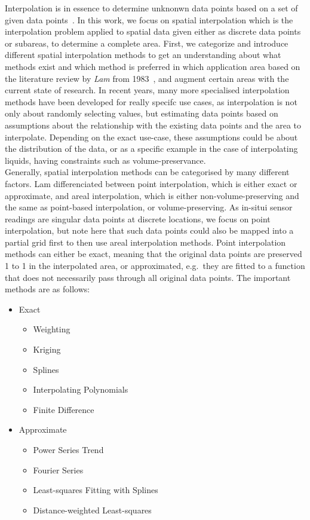 Interpolation is in essence to determine unknonwn data points based on a set of given data points~\cite{steffensen1927interpolation}. In this work, we focus on spatial interpolation which is the interpolation problem applied to spatial data given either as discrete data points or subareas, to determine a complete area. First, we categorize and introduce different spatial interpolation methods to get an understanding about what methods exist and which method is preferred in which application area based on the literature review by \textit{Lam} from 1983~\cite{lam1983spatial}, and augment certain areas with the current state of research. In recent years, many more specialised interpolation methods have been developed for really specifc use cases, as interpolation is not only about randomly selecting values, but estimating data points based on assumptions about the relationship with the existing data points and the area to interpolate. Depending on the exact use-case, these assumptions could be about the distribution of the data, or as a specific example in the case of interpolating liquids, having constraints such as volume-preservance.\\
Generally, spatial interpolation methods can be categorised by many different factors. Lam differenciated between point interpolation, which is either exact or approximate, and areal interpolation, which is either non-volume-preserving and the same as point-based interpolation, or volume-preserving. As in-situi sensor readings are singular data points at discrete locations, we focus on point interpolation, but note here that such data points could also be mapped into a partial grid first to then use areal interpolation methods.
Point interpolation methods can either be exact, meaning that the original data points are preserved 1 to 1 in the interpolated area, or approximated, e.g.\ they are fitted to a function that does not necessarily pass through all original data points. The important methods are as follows:

\begin{itemize}
    \item Exact

    \begin{itemize}
        \item Weighting
        \item Kriging
        \item Splines
        \item Interpolating Polynomials
        \item Finite Difference
    \end{itemize}

    \item Approximate

    \begin{itemize}
        \item Power Series Trend
        \item Fourier Series
        \item Least-squares Fitting with Splines
        \item Distance-weighted Least-squares
    \end{itemize}
\end{itemize}

